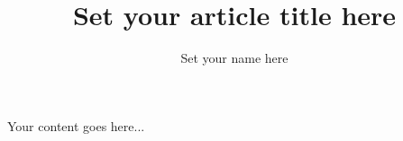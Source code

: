 \documentclass[12pt]{article}
\title{Set your article title here}
\author{Set your name here}
\begin{document}
Your content goes here...
\end{document}
